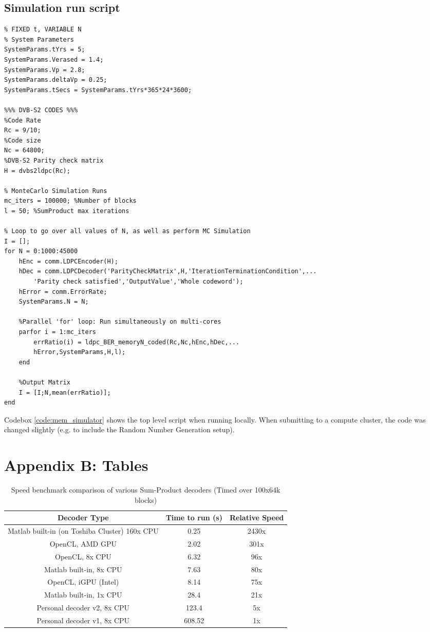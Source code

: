 \documentclass[11pt]{article}
\numberwithin{equation}{subsection}
\begin{document}
\subsection*{Simulation run script}
\begin{lstlisting}[style=Matlab-editor,caption = {Top-level Monte-Carlo simulation run script for the Memory channel},label=code:mem_simulator]
% LDPC Run Script for memory model
% FIXED t, VARIABLE N
% System Parameters
SystemParams.tYrs = 5;
SystemParams.Verased = 1.4;
SystemParams.Vp = 2.8;
SystemParams.deltaVp = 0.25;
SystemParams.tSecs = SystemParams.tYrs*365*24*3600;

%%% DVB-S2 CODES %%%
%Code Rate
Rc = 9/10;
%Code size
Nc = 64800;
%DVB-S2 Parity check matrix
H = dvbs2ldpc(Rc);

% MonteCarlo Simulation Runs
mc_iters = 100000; %Number of blocks
l = 50; %SumProduct max iterations

% Loop to go over all values of N, as well as perform MC Simulation
I = [];
for N = 0:1000:45000
    hEnc = comm.LDPCEncoder(H);
    hDec = comm.LDPCDecoder('ParityCheckMatrix',H,'IterationTerminationCondition',...
        'Parity check satisfied','OutputValue','Whole codeword');
    hError = comm.ErrorRate;
    SystemParams.N = N;

    %Parallel 'for' loop: Run simultaneously on multi-cores
    parfor i = 1:mc_iters
        errRatio(i) = ldpc_BER_memoryN_coded(Rc,Nc,hEnc,hDec,...
        hError,SystemParams,H,l);
    end

    %Output Matrix
    I = [I;N,mean(errRatio)];
end
\end{lstlisting}
\doublespacing
Codebox \ref{code:mem_simulator} shows the top level script when running locally. When submitting to a compute cluster, the code was changed slightly (e.g. to include the Random Number Generation setup).

{}
\section*{Appendix B: Tables}

\begin{table}[ht]
\caption{Speed benchmark comparison of various Sum-Product decoders (Timed over 100x64k blocks)}
\centering
\doublespacing
\begin{tabular}{| c | c | c |}
\hline
Decoder Type & Time to run (s) & Relative Speed \\
\hline
Matlab built-in (on Toshiba Cluster) 160x CPU & 0.25 & 2430x \\
OpenCL, AMD GPU & 2.02 & 301x \\
OpenCL, 8x CPU & 6.32 & 96x \\
Matlab built-in, 8x CPU & 7.63 & 80x \\
OpenCL, iGPU (Intel) & 8.14 & 75x \\
Matlab built-in, 1x CPU & 28.4 & 21x \\
Personal decoder v2, 8x CPU & 123.4 & 5x \\
Personal decoder v1, 8x CPU & 608.52 & 1x \\
\hline
\end{tabular}
\end{table}
\end{document}
